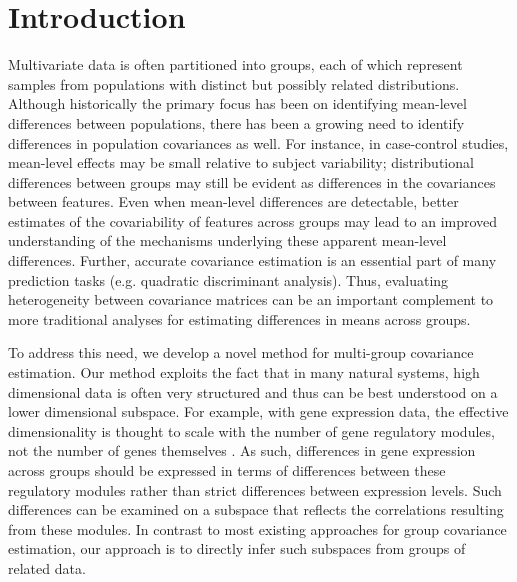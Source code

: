 \documentclass[12pt]{article}
\begin{document}
\section{Introduction}




Multivariate data is often partitioned into
groups, each of which represent samples from populations with
distinct but possibly related distributions.  Although historically the
primary focus has been on identifying mean-level differences between
populations, there has been a growing need to identify differences in
population covariances as well.  For instance, in case-control studies, mean-level effects may be small relative to subject
variability; distributional differences between groups may still be
evident as differences in the covariances between features.  Even when
mean-level differences are detectable, better estimates of the
covariability of features across groups may lead to an improved
understanding of the mechanisms underlying these apparent mean-level
differences.  Further, accurate covariance estimation is an essential
part of many prediction tasks (e.g. quadratic discriminant analysis).
Thus, evaluating heterogeneity between covariance
matrices can be an important complement to more traditional analyses
for estimating differences in means across
groups.

To address this need, we develop a novel method for
multi-group covariance estimation.  Our method exploits the fact that
in many natural systems, high dimensional data is often very
structured and thus can be best understood on a lower dimensional
subspace. For example, with gene expression data, the effective
dimensionality is thought to scale with the number of gene regulatory
modules, not the number of genes themselves \citep{Heimberg2016}.  As
such, differences in gene expression across groups should be expressed
in terms of differences between these regulatory modules rather than
strict differences between expression levels.  Such differences can be
examined on a subspace that reflects the correlations resulting from
these modules.  In contrast to most existing approaches for group
covariance estimation, our approach is to directly infer such
subspaces from groups of related data.
\end{document}
